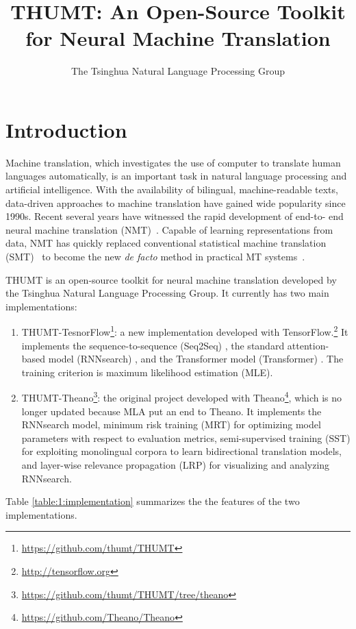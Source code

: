 \documentclass{article}
\title{THUMT: An Open-Source Toolkit for Neural Machine Translation}
\author{The Tsinghua Natural Language Processing Group}
\begin{document}
\maketitle

\section{Introduction}
Machine translation, which investigates the use of computer to translate human languages automatically, is an important task in natural language processing and artificial intelligence. With the availability of bilingual, machine-readable texts, data-driven approaches to machine translation have gained wide popularity since 1990s. Recent several years have witnessed the rapid development of end-to- end neural machine translation (NMT)~\citep{Sutskever:14,Bahdanau:15,Vaswani:17}. Capable of learning representations from data, NMT has quickly replaced conventional statistical machine translation (SMT)~\citep{Brown:93,Koehn:03,Chiang:05} to become the new {\em de facto} method in practical MT systems~\citep{Wu:16}.

THUMT is an open-source toolkit for neural machine translation developed by the Tsinghua Natural Language Processing Group. It currently has two main implementations:

\begin{enumerate}
\item THUMT-TesnorFlow\footnote{\href{https://github.com/thumt/THUMT}{https://github.com/thumt/THUMT}}: a new implementation developed with TensorFlow.\footnote{\href{http://tensorflow.org}{http://tensorflow.org}} It implements the sequence-to-sequence (Seq2Seq) \citep{Sutskever:14}, the standard attention-based model (RNNsearch) \citep{Bahdanau:15}, and the Transformer model (Transformer) \citep{Vaswani:17}. The training criterion is maximum likelihood estimation (MLE).
\item THUMT-Theano\footnote{\href{https://github.com/thumt/THUMT/tree/theano}{https://github.com/thumt/THUMT/tree/theano}}: the original project developed with Theano\footnote{\href{https://github.com/Theano/Theano}{https://github.com/Theano/Theano}}, which is no longer updated because MLA put an end to Theano. It implements the RNNsearch model, minimum risk training (MRT) \citep{Shen:16} for optimizing model parameters with respect to evaluation metrics, semi-supervised training (SST) \citep{Cheng:16} for exploiting monolingual corpora to learn bidirectional translation models, and layer-wise relevance propagation (LRP) \citep{Ding:17} for visualizing and analyzing RNNsearch.
\end{enumerate}
Table \ref{table:1:implementation} summarizes the the features of the two implementations.
\end{document}
